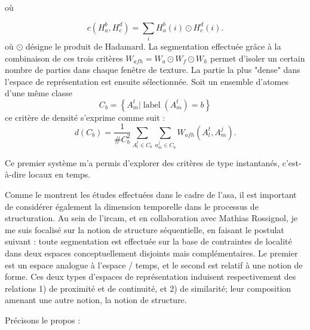 où

\begin{equation}
  { c \left( H _ { a } ^ { b } , H _ { c } ^ { d } \right) = \sum _ { i } H _ { a } ^ { b } ( i ) \odot H _ { c } ^ { d } ( i ) }.
\end{equation}
où $\odot$ désigne le produit de Hadamard.
La segmentation effectuée grâce à la combinaison de ces trois critères $W_ { a f h } = W_a \odot W_f \odot W_h$ permet d'isoler un certain nombre de parties dans chaque fenêtre de texture. La partie la plus "dense" dans l'espace de représentation est ensuite sélectionnée. Soit un ensemble d'atomes d'une même classe
$$C _ { b } = \left\{ A _ { m } ^ {t} | \operatorname { label } \left( A _ { m } ^ {t} \right) = b \right\}$$
ce critère de densité s'exprime comme suit :
\begin{equation}
  d \left( C _ { b } \right) = \frac { 1 } { \# C _ { b } ^ { 2 } } \sum _ { A _ { l } ^ {t} \in C _ { b } } \sum _ { a _ { m } ^ { j } \in C _ { b } } W _ { a f h } \left( A _ { l } ^ {t} , A _ { m } ^ { j } \right).
\end{equation}




Ce premier système m'a permis d'explorer des critères de type instantanés, c'est-à-dire locaux en temps.

Comme le montrent les études effectuées dans le cadre de l'asa, il est important de considérer également la dimension temporelle dans le processus de structuration. Au sein de l'ircam, et en collaboration avec Mathias Rossignol, je me suis focalisé sur la notion de structure séquentielle, en faisant le postulat suivant : toute segmentation est effectuée sur la base de contraintes de localité dans deux espaces conceptuellement disjoints mais complémentaires. Le premier est un espace analogue à l'espace / temps, et le second est relatif à une notion de forme. Ces deux types d'espaces de représentation induisent respectivement des relations 1) de proximité et de continuité, et 2) de similarité; leur composition amenant une autre notion, la notion de structure.

Précisons le propos : %

